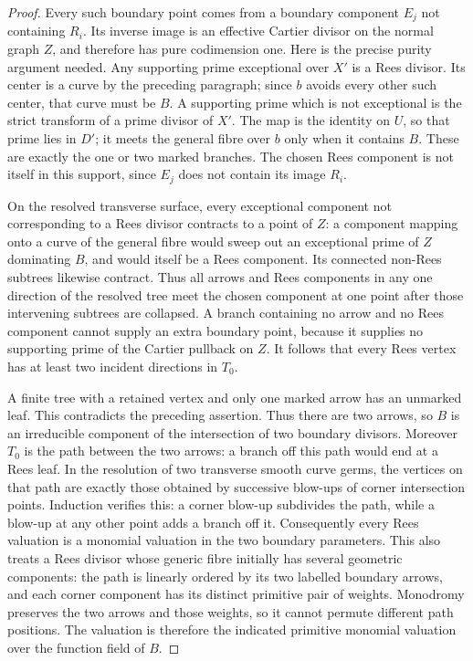 \begin{proof}
Every such boundary point comes from a boundary component $E_j$ not containing $R_i$. Its inverse image is an effective Cartier divisor on the normal graph $Z$, and therefore has pure codimension one. Here is the precise purity argument needed. Any supporting prime exceptional over $X'$ is a Rees divisor. Its center is a curve by the preceding paragraph; since $b$ avoids every other such center, that curve must be $B$. A supporting prime which is not exceptional is the strict transform of a prime divisor of $X'$. The map is the identity on $U$, so that prime lies in $D'$; it meets the general fibre over $b$ only when it contains $B$. These are exactly the one or two marked branches. The chosen Rees component is not itself in this support, since $E_j$ does not contain its image $R_i$.

On the resolved transverse surface, every exceptional component not corresponding to a Rees divisor contracts to a point of $Z$: a component mapping onto a curve of the general fibre would sweep out an exceptional prime of $Z$ dominating $B$, and would itself be a Rees component. Its connected non-Rees subtrees likewise contract. Thus all arrows and Rees components in any one direction of the resolved tree meet the chosen component at one point after those intervening subtrees are collapsed. A branch containing no arrow and no Rees component cannot supply an extra boundary point, because it supplies no supporting prime of the Cartier pullback on $Z$. It follows that every Rees vertex has at least two incident directions in $T_0$.

A finite tree with a retained vertex and only one marked arrow has an unmarked leaf. This contradicts the preceding assertion. Thus there are two arrows, so $B$ is an irreducible component of the intersection of two boundary divisors. Moreover $T_0$ is the path between the two arrows: a branch off this path would end at a Rees leaf. In the resolution of two transverse smooth curve germs, the vertices on that path are exactly those obtained by successive blow-ups of corner intersection points. Induction verifies this: a corner blow-up subdivides the path, while a blow-up at any other point adds a branch off it. Consequently every Rees valuation is a monomial valuation in the two boundary parameters. This also treats a Rees divisor whose generic fibre initially has several geometric components: the path is linearly ordered by its two labelled boundary arrows, and each corner component has its distinct primitive pair of weights. Monodromy preserves the two arrows and those weights, so it cannot permute different path positions. The valuation is therefore the indicated primitive monomial valuation over the function field of $B$.


\end{proof}
